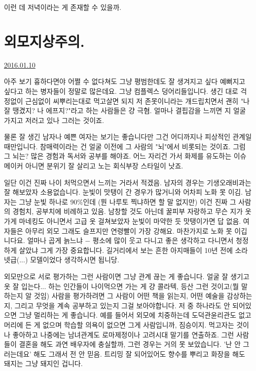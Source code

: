 이런 데 저녁이라는 게 존재할 수 있을까.
\vspace{5mm}









\section{외모지상주의.}
\href{https://www.kockoc.com/Apoc/582733}{2016.01.10}

\vspace{5mm}

아주 보기 흉하다면야 어쩔 수 없다쳐도 그냥 평범한데도
잘 생겨지고 싶다 예뻐지고 싶다고 하는 병자들이 정말로 많은데요.
그냥 컴플렉스 덩어리들입니다.
생긴 대로 걱정없이 근심없이 씨뿌리는대로 먹고살면 되지
저 존못이니라는 개드립치면서 괜히 "나 잘 땡겼지? 나 에프지?"라고 하는 사람들은 걍 극혐.
얼마나 결핍감을 느끼면 지 얼굴 가지고 저러고 있나 그러는 것이죠.
\vspace{5mm}

물론 잘 생긴 남자나 예쁜 여자는 보기는 좋습니다만 그건 어디까지나 피상적인 관계일 때만입니다.
참매력이라는 건 얼굴 이전에 그 사람의 "뇌"에서 비롯되는 것이죠.
그럼 그 뇌는? 많은 경험과 독서와 공부를 해야죠.
어느 자리건 가서 화제를 유도하는 이슈메이커 아니면 분위기 잘 살리고 노는 회식부장 스타일이 낫죠.
\vspace{5mm}

일단 이건 진짜 나이 처먹으면서 느끼는 거라서 적겠음.
남자의 경우는 기생오래비과는 잘 해보았자 소용없습니다. 눈빛이 맛탱이 간 경우가 많거니와 어차피 노화 못 이김.
남자는 그냥 눈빛 하나로 90$\%$인데 (뭔 나루토 찍냐하면 할 말 없지만) 이건 진짜 그 사람의 경험치, 공부치에 비례하고 있음.
남창할 것도 아닌데 꿀피부 자랑하고 무슨 지가 옷가게 마네킹도 아니면서 고급 옷 걸쳐보았자 눈빛이 마약한 듯 맛탱이가면 답 없음.
여자들은 아무리 외모 그래도 슬프지만 연령빨이 가장 강해요. 마찬가지로 노화 못 이깁니다요.
얼마나 곱게 늙느냐 $-$ 평소에 많이 웃고 다니고 좋은 생각하고 다니면서 청정하게 살았냐 그게 가장 중요합니다.
길거리에서 보는 흔한 아지매들이 10년 전에 소라넷급(...) 모델이었다 생각하시면 됩니당.
\vspace{5mm}

외모만으로 서로 평가하는 그런 사람이면 그냥 관계 끊는 게 좋습니다.
얼굴 잘 생기고 옷 잘 입는다... 하는 인간들이 나이먹으면 가는 게 걍 콜라텍, 등산 그런 것이고(뭘 말하는지 알 것임)
사람을 평가하려면 그 사람이 어떤 책을 읽는지, 어떤 예술을 감상하는지, 그리고 무엇을 계속 공부하고 있는지 그걸 보아야합니다.
저 중 하나라도 안 되어있으면 그냥 멀리하는 게 좋습니다.
예를 들어서 외모에 치중하는데 도덕관윤리관도 없고 머리에 든 게 없으며 학습할 의욕이 없으면 그게 사람입니까, 짐승이지.
먹고자는 것이나 좋아하고 나중에는 남녀관계도 로마제정이나 고려시대 말기를 연출하죠.
그런 사람들이 결혼을 해도 과연 배우자에 충실할까, 그런 경우는 거의 못 보았습니다. '난 안 그러는데요' 해도 그래서 전 안 믿음.
트리밍 잘 되어있어도 향수를 뿌리고 화장을 해도 돼지는 그냥 돼지인 겁니다.
\vspace{5mm}



